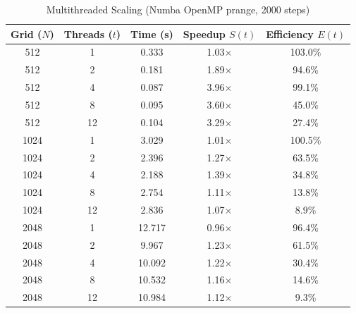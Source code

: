 \begin{table}[htbp]
\centering
\small
\caption{Multithreaded Scaling (Numba OpenMP prange, 2000 steps)}
\label{tab:threads}
\begin{tabular}{ccccc}
\hline
\textbf{Grid ($N$)} & \textbf{Threads ($t$)} & \textbf{Time (s)} & \textbf{Speedup $S(t)$} & \textbf{Efficiency $E(t)$} \\
\hline
512 & 1 & 0.333 & 1.03$\times$ & 103.0\% \\
512 & 2 & 0.181 & 1.89$\times$ & 94.6\% \\
512 & 4 & 0.087 & 3.96$\times$ & 99.1\% \\
512 & 8 & 0.095 & 3.60$\times$ & 45.0\% \\
512 & 12 & 0.104 & 3.29$\times$ & 27.4\% \\
\hline
1024 & 1 & 3.029 & 1.01$\times$ & 100.5\% \\
1024 & 2 & 2.396 & 1.27$\times$ & 63.5\% \\
1024 & 4 & 2.188 & 1.39$\times$ & 34.8\% \\
1024 & 8 & 2.754 & 1.11$\times$ & 13.8\% \\
1024 & 12 & 2.836 & 1.07$\times$ & 8.9\% \\
\hline
2048 & 1 & 12.717 & 0.96$\times$ & 96.4\% \\
2048 & 2 & 9.967 & 1.23$\times$ & 61.5\% \\
2048 & 4 & 10.092 & 1.22$\times$ & 30.4\% \\
2048 & 8 & 10.532 & 1.16$\times$ & 14.6\% \\
2048 & 12 & 10.984 & 1.12$\times$ & 9.3\% \\
\hline
\end{tabular}
\end{table}
